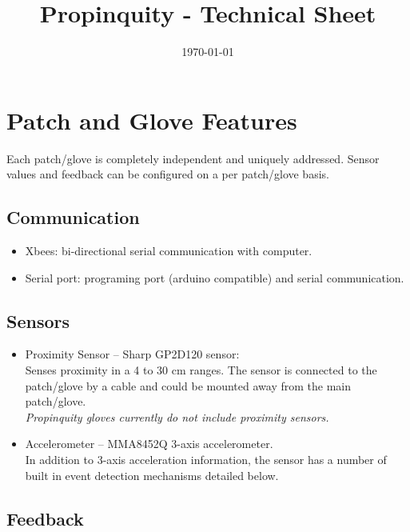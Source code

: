 \documentclass{article}
\begin{document}
\title{Propinquity - Technical Sheet \\ \vspace{-2em}}
\date{\today}

\maketitle


\section*{Patch and Glove Features}

Each patch/glove is completely independent and uniquely addressed. Sensor values and feedback can be configured on a per patch/glove basis.

\subsection*{Communication}

\begin{itemize}[noitemsep,nolistsep]
	\item Xbees: bi-directional serial communication with computer.
	\item Serial port: programing port (arduino compatible) and serial communication.
\end{itemize}

\subsection*{Sensors}

\begin{itemize}[noitemsep,nolistsep]
	\item Proximity Sensor -- Sharp GP2D120 sensor: \\ Senses proximity in a 4 to 30 cm ranges. The sensor is connected to the patch/glove by a cable and could be mounted away from the main patch/glove. \\ {\em Propinquity gloves currently do not include proximity sensors.}
	\item Accelerometer -- MMA8452Q 3-axis accelerometer. \\ In addition to 3-axis acceleration information, the sensor has a number of built in event detection mechanisms detailed below.
\end{itemize}

\subsection*{Feedback}
\end{document}
